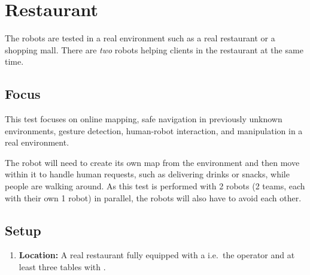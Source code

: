 \section{Restaurant}
The robots are tested in a real environment such as a real restaurant or a shopping mall.
There are \emph{two} robots helping clients in the restaurant at the same time.

\subsection{Focus}
This test focuses on online mapping, safe navigation in previously unknown environments, gesture detection, human-robot interaction, and manipulation in a real environment.

The robot will need to create its own map from the environment and then move within it to handle human requests, such as delivering drinks or snacks, while people are walking around.
As this test is performed with 2 robots (2 teams, each with their own 1 robot) in parallel, the robots will also have to avoid each other.

\subsection{Setup}
\begin{enumerate}
	\item \textbf{Location:} A real restaurant fully equipped with a  i.e.~the operator and at least three tables with .
\end{enumerate}


